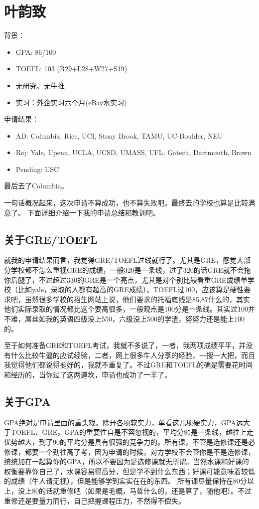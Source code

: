 \section{叶韵致}
背景：
\begin{itemize}
\item GPA: 86/100
\item TOEFL: 103 (R29+L28+W27+S19)
\item 无研究、无牛推
\item 实习：外企实习六个月(eBay水实习)
\end{itemize}\par
申请结果：
\begin{itemize}
\item AD: Columbia, Rice, UCI, Stony Brook, TAMU, UC-Boulder, NEU
\item Rej: Yale, Upenn, UCLA, UCSD, UMASS, UFL, Gatech, Dartmouth, Brown
\item Pending: USC
\end{itemize}
最后去了Columbia。\par
一句话概况起来，这次申请不算成功，也不算失败吧。最终去的学校也算是比较满意了。
下面详细介绍一下我的申请总结和教训吧。
\subsection{关于GRE/TOEFL}
就我的申请结果而言，我觉得GRE/TOEFL过线就行了。尤其是GRE，感觉大部分学校都不怎么重视GRE的成绩，一般320是一条线，过了320的话GRE就不会拖你后腿了，不过超过330的GRE是一个亮点，尤其是对个别比较看重GRE成绩单学校（比如yale，录取的人都有超高的GRE成绩）。TOEFL过100，应该算是硬性要求吧，虽然很多学校的招生网站上说，他们要求的托福底线是85,87什么的，其实他们实际录取的情况都比这个要高很多，一般观点是100分是一条线。其实过100并不难，屌丝如我的英语四级没上550，六级没上500的学渣，努努力还是能上100的。\par
至于如何准备GRE和TOEFL考试，我就不多说了，一者，我两项成绩平平，并没有什么比较牛逼的应试经验，二者，网上很多牛人分享的经验，一搜一大把，而且我觉得他们都说得挺好的，我就不重复了。不过GRE和TOEFL的确是需要花时间和经历的，当你过了这两道坎，申请也成功了一半了。
\subsection{关于GPA}
GPA绝对是申请里面的重头戏。除开各项软实力，单看这几项硬实力，GPA远大于TOEFL、GRE。GPA的重要性自是不容忽视的，平均分85是一条线，越往上走优势越大，到了90的平均分是具有很强的竞争力的。所有课，不管是选修课还是必修课，都要一个劲往高了考，因为申请的时候，对方学校不会管你是不是选修课，统统加在一起算你的GPA，所以不要因为是选修课就无所谓。当然水课和好课的权衡要靠你自己了，水课容易得高分，但是学不到什么东西；好课可能意味着较低的成绩（牛人请无视），但是能够学到实实在在的东西。 所有课尽量保持在80分以上，没上80的话就重修吧（如果是毛概，马哲什么的，还是算了，随他吧）。不过重修还是要量力而行，自己把握课程压力，不然得不偿失。
